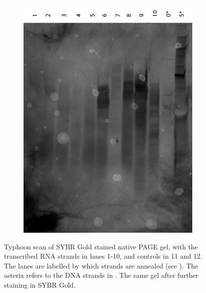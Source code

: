 \begin{figure}[h]
\begin{subfigure}[t]{0.49\textwidth}
    \includegraphics[width=\textwidth]{images/translator_transcription_2.png}
    \caption{}
    \label{transcription_2}
  \end{subfigure}
  \caption{ Typhoon scan of SYBR Gold stained native PAGE gel, with the transcribed RNA strands in lanes 1-10, and controls in 11 and 12. The lanes are labelled by which strands are annealed (see ). The asterix refers to the DNA strands in .  The same gel after further staining in SYBR Gold.}
\end{figure}

